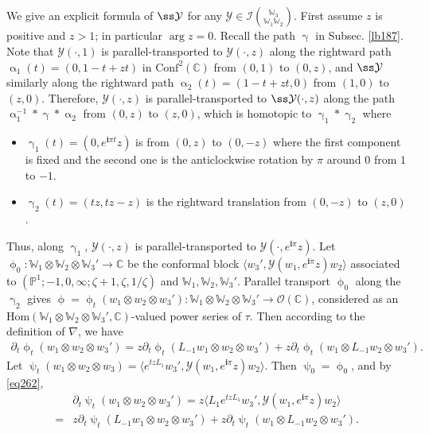 \documentclass[12pt,a4paper,notitlepage]{article}
\theoremstyle{definition}
\theoremstyle{plain}
\newcommand{\mc}{\mathcal}
\newcommand{\Hom}{\mathrm{Hom}}
\newcommand{\Conf}{\mathrm{Conf}}
\newcommand{\bk}[1]{\langle {#1}\rangle}
\newcommand{\scr}{\mathscr}
\newcommand{\im}{\mathbf{i}}
\newcommand{\Wbb}{\mathbb W}
\newcommand{\Cbb}{\mathbb C}
\newcommand{\Pbb}{\mathbb P}
\numberwithin{equation}{section}
\begin{document}
\subsection{}

We give an explicit formula of $\ss\mc Y$ for any $\mc Y\in\mc I{\Wbb_3\choose\Wbb_1\Wbb_2}$. First assume $z$ is positive and $z>1$; in particular $\arg z=0$. Recall the path $\upgamma$ in Subsec. \ref{lb187}. Note that $\mc Y(\cdot, 1)$ is parallel-transported to $\mc Y(\cdot,z)$ along the rightward path $\upalpha_1(t)=(0,1-t+zt)$ in $\Conf^2(\Cbb)$ from $(0,1)$ to $(0,z)$, and $\ss\mc Y$ similarly along the rightward path $\upalpha_2(t)=(1-t+zt,0)$ from $(1,0)$ to $(z,0)$. Therefore, $\mc Y(\cdot,z)$ is parallel-transported to $\ss\mc Y(\cdot,z)$ along the path $\upalpha^{-1}_1*\upgamma*\upalpha_2$  from  $(0,z)$ to $(z,0)$, which is homotopic to $\upgamma_1*\upgamma_2$ where
\begin{itemize}
\item $\upgamma_1(t)=(0,e^{\im \pi t}z)$ is from $(0,z)$ to $(0,-z)$ where the first component is fixed and the second one is the anticlockwise rotation by $\pi$ around $0$ from $1$ to $-1$.
\item $\upgamma_2(t)=(tz,tz-z)$ is the rightward translation from $(0,-z)$ to $(z,0)$.
\end{itemize}
Thus, along $\upgamma_1$, $\mc Y(\cdot,z)$ is parallel-transported to $\mc Y(\cdot,e^{\im\pi}z)$. Let $\upphi_0:\Wbb_1\otimes\Wbb_2\otimes\Wbb_3'\rightarrow\Cbb$ be the conformal block $\bk{w_3',\mc Y(w_1,e^{\im\pi}z)w_2}$ associated to $(\Pbb^1;-1,0,\infty;\zeta+1,\zeta,1/\zeta)$ and $\Wbb_1,\Wbb_2,\Wbb_3'$. Parallel transport $\upphi_0$ along the  $\upgamma_2$  gives $\upphi=\upphi_t(w_1\otimes w_2\otimes w_3'):\Wbb_1\otimes\Wbb_2\otimes\Wbb_3'\rightarrow\scr O(\Cbb)$, considered as an $\Hom(\Wbb_1\otimes\Wbb_2\otimes\Wbb_3',\Cbb)$-valued power series of $\tau$. Then according to the definition of $\nabla$, we have
\begin{align*}
\partial_t\upphi_t(w_1\otimes w_2\otimes w_3')=z\partial_t\upphi_t(L_{-1}w_1\otimes w_2\otimes w_3')+z\partial_t\upphi_t(w_1\otimes L_{-1}w_2\otimes w_3').
\end{align*}
Let $\uppsi_t(w_1\otimes w_2\otimes w_3)=\bk{e^{tz L_1}w_3',\mc Y(w_1,e^{\im\pi}z)w_2}$. Then $\uppsi_0=\upphi_0$, and by \eqref{eq262},
\begin{align*}
&\partial_t\uppsi_t(w_1\otimes w_2\otimes w_3')=z\bk{L_1e^{tz L_1}w_3',\mc Y(w_1,e^{\im\pi}z)w_2}\\
=&z\partial_t\uppsi_t(L_{-1}w_1\otimes w_2\otimes w_3')+z\partial_t\uppsi_t(w_1\otimes L_{-1}w_2\otimes w_3').
\end{align*}
\end{document}
